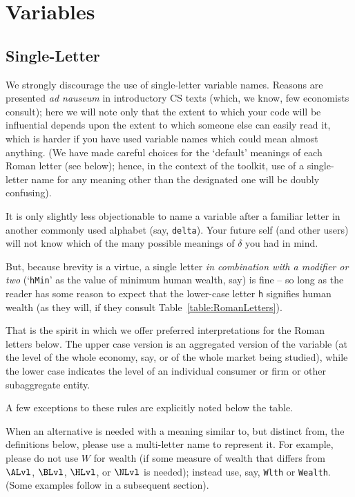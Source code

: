 \documentclass[12pt]{\econtex}
\begin{document}
\pagebreak

\section{Variables}

\subsection{Single-Letter}

We strongly discourage the use of single-letter variable names.  Reasons are presented \textit{ad nauseum} in introductory CS texts (which, we know, few economists consult); here we will note only that the extent to which your code will be influential depends upon the extent to which someone else can easily read it, which is harder if you have used variable names which could mean almost anything.  (We have made careful choices for the `default' meanings of each Roman letter (see below); hence, in the context of the toolkit, use of a single-letter name for any meaning other than the designated one will be doubly confusing).

It is only slightly less objectionable to name a variable after a familiar letter in another commonly used alphabet (say, \texttt{delta}).  Your future self (and other users) will not know which of the many possible meanings of $\delta$ you had in mind.

But, because brevity is a virtue, a single letter \textit{in combination with a modifier or two} (`\texttt{hMin}' as the value of minimum human wealth, say) is fine -- so long as the reader has some reason to expect that the lower-case letter \texttt{h} signifies human wealth (as they will, if they consult Table~\ref{table:RomanLetters}).

That is the spirit in which we offer preferred interpretations for the Roman letters below.  The upper case version is an aggregated version of the variable (at the level of the whole economy, say, or of the whole market being studied), while the lower case indicates the level of an individual consumer or firm or other subaggregate entity.

A few exceptions to these rules are explicitly noted below the table.

When an alternative is needed with a meaning similar to, but distinct from, the definitions below, please use a multi-letter name to represent it.  For example, please do not use $W$ for wealth (if some measure of wealth that differs from $\ALvl$, $\BLvl$, $\HLvl$, or $\NLvl$ is needed); instead use, say, \texttt{Wlth} or \texttt{Wealth}.  (Some examples follow in a subsequent section).
\end{document}
